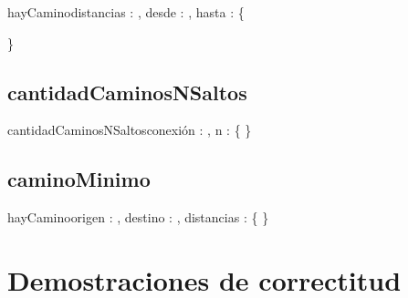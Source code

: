 \documentclass[10pt,a4paper]{article}
\begin{document}
\begin{proc}{hayCamino}{\In distancias : \TLista{\TLista{\ent}}, \In desde : \ent, \In hasta : \ent}{\bool \{ } 
	
	
	\}
\end{proc}

\subsection{cantidadCaminosNSaltos}

\begin{proc}{cantidadCaminosNSaltos}{\Inout conexión : \TLista{\TLista{\ent}}, \In n : \ent}{ \{ } 
	\requiere{\{ \True\}}
	\asegura{\{\True\}}
	\}
\end{proc}

\subsection{caminoMinimo}

\begin{proc}{hayCamino}{\In origen : \ent, \In destino : \ent, \In distancias : \TLista{\TLista{\ent}}}{\TLista{\ent} \{ } 
	\requiere{\{ \True \}}
	\asegura{\{\True\}}
	\}
\end{proc}

\section{Demostraciones de correctitud}
\end{document}
